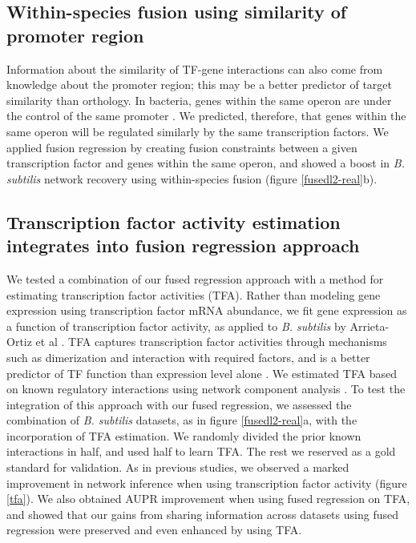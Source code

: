 \documentclass[11pt]{article}
\begin{document}
\subsection{Within-species fusion using similarity of promoter region}
Information about the similarity of TF-gene interactions can also come from knowledge about the promoter region; this may be a better predictor of target similarity than orthology. In bacteria, genes within the same operon are under the control of the same promoter \cite{lawrence_shared_2002}. We predicted, therefore, that genes within the same operon will be regulated similarly by the same transcription factors. We applied fusion regression by creating fusion constraints between a given transcription factor and genes within the same operon, and showed a boost in \textit{B. subtilis} network recovery using within-species fusion (figure \ref{fusedl2-real}b). 

\subsection{Transcription factor activity estimation integrates into fusion regression approach}
We tested a combination of our fused regression approach with a method for estimating transcription factor activities (TFA). Rather than modeling gene expression using transcription factor mRNA abundance, we fit gene expression as a function of transcription factor activity, as applied to \textit{B. subtilis} by Arrieta-Ortiz et al \cite{arrieta-ortiz_experimentally_2015}. TFA captures transcription factor activities through mechanisms such as dimerization and interaction with required factors, and is a better predictor of TF function than expression level alone \cite{fu_reconstructing_2011}. We estimated TFA based on known regulatory interactions using network component analysis \cite{liao2003network}. To test the integration of this approach with our fused regression, we assessed the combination of \textit{B. subtilis} datasets, as in figure \ref{fusedl2-real}a, with the incorporation of TFA estimation. We randomly divided the prior known interactions in half, and used half to learn TFA. The rest we reserved as a gold standard for validation. As in previous studies, we observed a marked improvement in network inference when using transcription factor activity (figure \ref{tfa}). We also obtained AUPR improvement when using fused regression on TFA, and showed that our gains from sharing information across datasets using fused regression were preserved and even enhanced by using TFA. 
\end{document}
